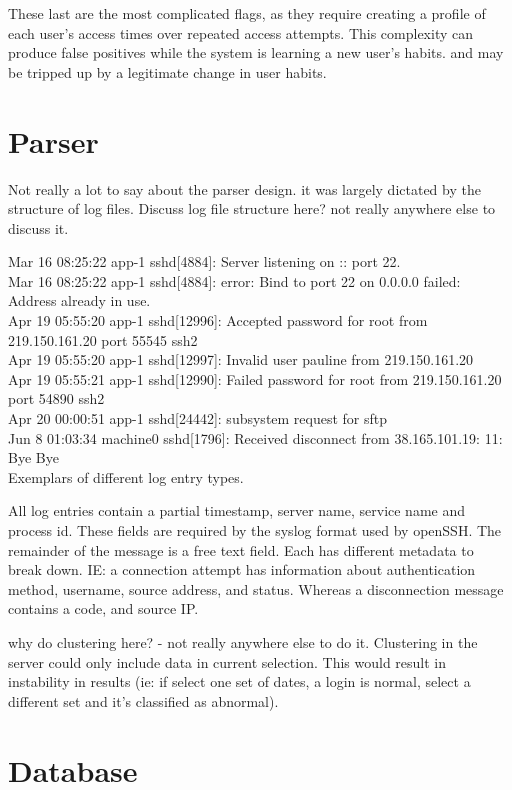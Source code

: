 These last are the most complicated flags, as they require creating a profile of each user's access times over repeated access attempts. This complexity can produce false positives while the system is learning a new user's habits. and may be tripped up by a legitimate change in user habits.

\section{Parser}\label{parser}
Not really a lot to say about the parser design. it was largely dictated by the structure of log files.
Discuss log file structure here? not really anywhere else to discuss it.

Mar 16 08:25:22 app-1 sshd[4884]: Server listening on :: port 22. \\
Mar 16 08:25:22 app-1 sshd[4884]: error: Bind to port 22 on 0.0.0.0 failed: Address already in use. \\
Apr 19 05:55:20 app-1 sshd[12996]: Accepted password for root from 219.150.161.20 port 55545 ssh2 \\
Apr 19 05:55:20 app-1 sshd[12997]: Invalid user pauline from 219.150.161.20 \\
Apr 19 05:55:21 app-1 sshd[12990]: Failed password for root from 219.150.161.20 port 54890 ssh2 \\
Apr 20 00:00:51 app-1 sshd[24442]: subsystem request for sftp \\
Jun 8 01:03:34 machine0 sshd[1796]: Received disconnect from 38.165.101.19: 11: Bye Bye \\

Exemplars of different log entry types.


All log entries contain a partial timestamp, server name, service name and process id. These fields are required by the syslog format used by openSSH. The remainder of the message is a free text field. Each has different metadata to break down. IE:  a connection attempt has information about authentication method, username, source address, and status. Whereas a disconnection message contains a code, and 
source IP.

why do clustering here? - not really anywhere else to do it. Clustering in the server could only include data in current selection. This would result in instability in results (ie: if select one set of dates, a login is normal, select a different set and it's classified as abnormal). 

\section{Database} 

